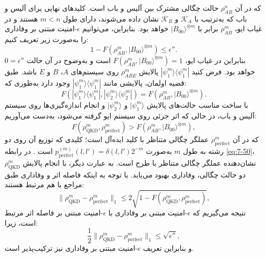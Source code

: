 که در آن $\rho_{AB}^n$ حالت چگالی مشترک بین آلیس و باب است. کلیدهای نهایی برای آلیس و باب که به‌ترتیب با $\mathcal{K}_A$ و $\mathcal{K}_B$ نشان داده می‌شوند، دارای طول $m < n$ هستند و در غیاب ایو، $\rho_{AB}^m$ برابر با $|B_{00}\rangle^{\otimes m}$ خواهد بود. بنابراین، می‌توانیم $\epsilon$-امنیت مبتنی بر وفاداری را به‌صورت زیر تعریف کنیم:
\begin{equation}
	1 - F(\rho_{AB}^m, |B_{00}\rangle^{\otimes m}) \leq \epsilon''.
	\label{eq:7-48}
\end{equation}
بنابراین در غیاب ایو، $F(\rho_{AB}^m, |B_{00}\rangle^{\otimes m}) = 1$ است و به‌وضوح در آن حالت $0 = \epsilon''$ خواهد بود. فرض کنید $|\psi_1^m\rangle\langle\psi_1^m|$ پالایش $\rho_{ABE}^m$ روی سیستم‌های $A$، $B$ و $E$ باشد. طبق قضیه اولمان، پالایشی مانند $|\psi_1^m\rangle\langle\psi_1^m|$ وجود دارد به‌طوری که:
\begin{equation}
	F(|\psi_1^m\rangle\langle\psi_1^m|, |\psi_2^m\rangle\langle\psi_2^m|) = F(\rho_{AB}^m, |B_{00}\rangle^{\otimes m}).
	\label{eq:7-49}
\end{equation}
با ساخت مناسب حالت‌های پالایش $|\psi_1^m\rangle$ و $|\psi_2^m\rangle$ و انجام اندازه‌گیری‌ها روی سیستم آلیس و باب، در حالی که اثر جزئی روی سیستم ایو گرفته می‌شود، به‌دست می‌آوریم:
\begin{equation}
	F(\rho_{\text{QKD}}^m, \rho_{\text{perfect}}^m) > F(\rho_{AB}^m, |B_{00}\rangle^{\otimes m}),
	\label{eq:7-50}
\end{equation}
که در آن $\rho_{\text{perfect}}^m$ عملگر چگالی متناظر با کلید ایده‌آل است؛ کلیدی که توزیع آن روی دو رشته به طول $m$ به‌صورت $p_{\text{perfect}}^{(m)}(l, l') = \delta(l, l') 2^{-m}$ است \cite{7-58}. در رابطه \eqref{eq:7-50}، $\rho_{\text{QKD}}^m$ نشان‌دهنده عملگر چگالی متناظر با طرح  است. به عبارت دیگر، با انجام پالایش دو حالت چگالی، وفاداری بهبود می‌یابد. با توجه به اینکه فاصله اثر و وفاداری طبق مراجع \cite{7-6, 7-61} با هم مرتبط هستند:
\begin{equation}
	\|\rho_{\text{QKD}}^m - \rho_{\text{perfect}}^m\|_1 \leq 2 \sqrt{1 - F(\rho_{\text{QKD}}^m, \rho_{\text{perfect}}^m)},
	\label{eq:7-51}
\end{equation}
نتیجه می‌گیریم که $\epsilon$-امنیت مبتنی بر وفاداری با $\epsilon$-امنیت مبتنی بر فاصله اثر مرتبط است، زیرا:
\begin{equation}
	\frac{1}{2} \|\rho_{\text{QKD}}^m - \rho_{\text{perfect}}^m\|_1 \leq \sqrt{\epsilon''},
	\label{eq:7-52}
\end{equation}
و بنابراین تعریف $\epsilon$-امنیت مبتنی بر وفاداری نیز ترکیب‌پذیر است.

